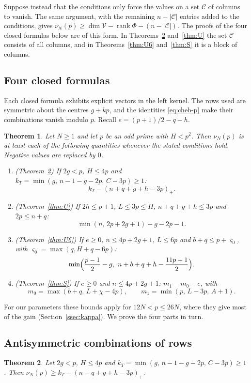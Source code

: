 \documentclass[11pt]{amsart}
\newtheorem{theorem}{Theorem}[section]
\theoremstyle{definition}
\theoremstyle{remark}
\numberwithin{equation}{section}
\newcommand{\cV}{\mathcal V}
\begin{document}
Suppose instead that the conditions only force the values on a set $\mathcal C$ of columns to vanish. The
same argument, with the remaining $n-|\mathcal C|$ entries added to the conditions, gives
$\nu_N(p)\ge\dim\cV-\operatorname{rank}\Phi-(n-|\mathcal C|)$. The proofs of the four closed formulas below
are of this form. In Theorems~\ref{thm:T} and~\ref{thm:U} the set $\mathcal C$ consists of all columns, and in
Theorems~\ref{thm:U6} and~\ref{thm:S} it is a block of columns.

\subsection{Four closed formulas}
Each closed formula exhibits explicit vectors in the left kernel. The rows used are symmetric about the
centres $g+kp$, and the identities \eqref{eq:cheb-p} make their combinations vanish modulo $p$. Recall
$e=(p+1)/2-q-h$.

\begin{theorem}\label{thm:content}
Let $N\ge1$ and let $p$ be an odd prime with $H<p^2$. Then $\nu_N(p)$ is at least each of the following
quantities whenever the stated conditions hold. Negative values are replaced by $0$.
\begin{enumerate}[label=(\alph*)]
\item (Theorem~\ref{thm:T}) If $2g<p$, $H\le4p$ and $k_T=\min(g,\,n-1-g-2p,\,C-3p)\ge1$:
\[
 k_T-(n+q+g+h-3p)_+ .
\]
\item (Theorem~\ref{thm:U}) If $2h\le p+1$, $L\le3p\le H$, $n+q+g+h\le3p$ and $2p\le n+q$:
\[
 \min(n,\,2p+2g+1)-g-2p-1 .
\]
\item (Theorem~\ref{thm:U6}) If $e\ge0$, $n\le4p+2g+1$, $L\le6p$ and $b+q\le p+\varsigma_0$, with
$\varsigma_0=\max(q,H+q-6p)$:
\[
 \min\Bigl(\frac{p-1}2-g,\ n+b+q+h-\frac{11p+1}2\Bigr).
\]
\item (Theorem~\ref{thm:S}) If $e\ge0$ and $n\le4p+2g+1$: $m_1-m_0-e$, with
\[
 m_0=\max(b+q,\,L+\chi-4p),\qquad m_1=\min(p,\,L-3p,\,A+1).
\]
\end{enumerate}
\end{theorem}

For our parameters these bounds apply for $12N<p\le26N$, where they give most of the gain
(Section~\ref{ssec:kappa}). We prove the four parts in turn.

\subsection{Antisymmetric combinations of rows}
\begin{theorem}\label{thm:T}
Let $2g<p$, $H\le4p$ and $k_T=\min(g,\,n-1-g-2p,\,C-3p)\ge1$. Then
$\nu_N(p)\ge k_T-(n+q+g+h-3p)_+$.
\end{theorem}
\end{document}
